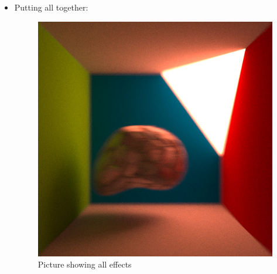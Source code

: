 \documentclass[11pt,a4paper]{article}
\begin{document}
\begin{itemize}
\item
Putting all together:\\
\begin{figure}[H]
\begin{center}
\includegraphics[scale=0.4]{images/deformedstone2100spp}
\caption[Picture showing all effects]{Picture showing all effects}
\label{fig:7}
\end{center}
\end{figure}

\end{itemize}




\end{document}
